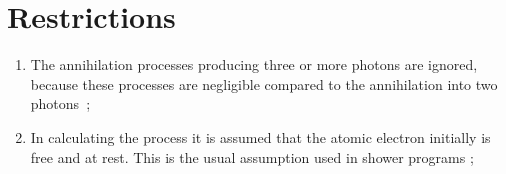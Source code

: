 \section{Restrictions}
\begin{enumerate}
\item
The annihilation processes producing three or more photons are
ignored, because these processes are negligible compared to the 
annihilation into two photons~\cite{bib-EGS3,bib-MES1};
\item
In calculating the process it is assumed that the atomic electron initially
is free and at rest. This is the usual assumption used in shower programs
\cite{bib-EGS3};
\end {enumerate}
